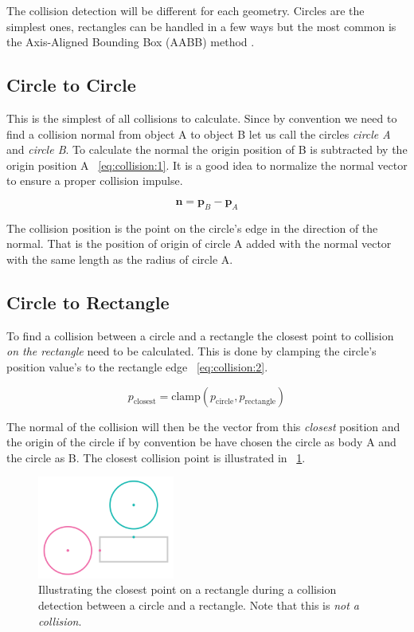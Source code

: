 \documentclass[a4paper,12pt]{report}
\begin{document}
The collision detection will be different for each geometry. Circles are the simplest ones, rectangles can be handled in a few ways but the most common is the Axis-Aligned Bounding Box (AABB) method \cite{aabb}.

\subsection{Circle to Circle}

This is the simplest of all collisions to calculate. Since by convention we need to find a collision normal from object A to object B let us call the circles \emph{circle A} and \emph{circle B}. To calculate the normal the origin position of B is subtracted by the origin position A ~\ref{eq:collision:1}. It is a good idea to normalize the normal vector to ensure a proper collision impulse.

\begin{equation}
\mathbf n=\mathbf p_{B}-\mathbf p_{A}
\label{eq:collision:1}
\end{equation}

The collision position is the point on the circle's edge in the direction of the normal. That is the position of origin of circle A added with the normal vector with the same length as the radius of circle A.

\subsection{Circle to Rectangle}

To find a collision between a circle and a rectangle the closest point to collision \emph{on the rectangle} need to be calculated. This is done by clamping the circle's position value's to the rectangle edge ~\ref{eq:collision:2}.

\begin{equation}
p_{\text{closest}}=\text{clamp}( p_{\text{circle}}, p_{\text{rectangle}})
\label{eq:collision:2}
\end{equation}

The normal of the collision will then be the vector from this \emph{closest} position and the origin of the circle if by convention be have chosen the circle as body A and the circle as B. The closest collision point is illustrated in ~\ref{fig:closest}.

\begin{figure}[!ht]
    \centering
    \includegraphics[width=0.4\textwidth]{figures/closest.png}
    \caption{Illustrating the closest point on a rectangle during a collision detection between a circle and a rectangle. Note that this is \emph{not a collision}.}
    \label{fig:closest}
\end{figure}
\end{document}
